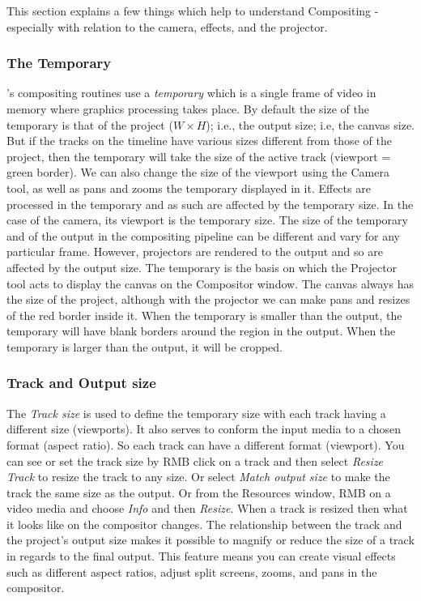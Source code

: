 This section explains a few things which help to understand Compositing - especially with relation
to the camera, effects, and the projector.

\subsubsection*{The Temporary}%
\label{ssub:output_size}

\CGG{}'s compositing routines use a \textit{temporary} which is a single frame of video in memory where graphics processing takes place. By default the size of the temporary is that of the project ($W \times H$); i.e., the output size; i.e, the canvas size. But if the tracks on the timeline have various sizes different from those of the project, then the temporary will take the size of the active track (viewport = green border). We can also change the size of the viewport using the Camera tool, as well as pans and zooms the temporary displayed in it. Effects are processed in the temporary and as such are affected by the temporary size.  In the case of the camera, its viewport is the temporary size.  The size of the temporary and of the output in the compositing pipeline can be different and vary for any particular frame. However, projectors are rendered to the output and so are affected by the output size. The temporary is the basis on which the Projector tool acts to display the canvas on the Compositor window. The canvas always has the size of the project, although with the projector we can make pans and resizes of the red border inside it. When the temporary is smaller than the output, the temporary will have blank borders around the region in the output.  When the temporary is larger than the output, it will be cropped.

\subsubsection*{Track and Output size}%
\label{ssub:track_size}

The \textit{Track size} is used to define the temporary size with each track having a different size (viewports). It also serves to conform the input media to a chosen format (aspect ratio). So each track can have a different format (viewport).
You can see or set the track size by RMB click on a track and then select \emph{Resize Track} to resize
the track to any size. Or select \emph{Match output size} to make the track the same size as the
output. Or from the Resources window, RMB on a video media and choose \textit{Info} and then \textit{Resize}. When a track is resized then what it looks like on the compositor changes.  The relationship
between the track and the project's output size makes it possible to magnify or reduce the size of
a track in regards to the final output. This feature means you can create visual effects such as different aspect ratios, adjust split screens, zooms, and pans in the compositor.

